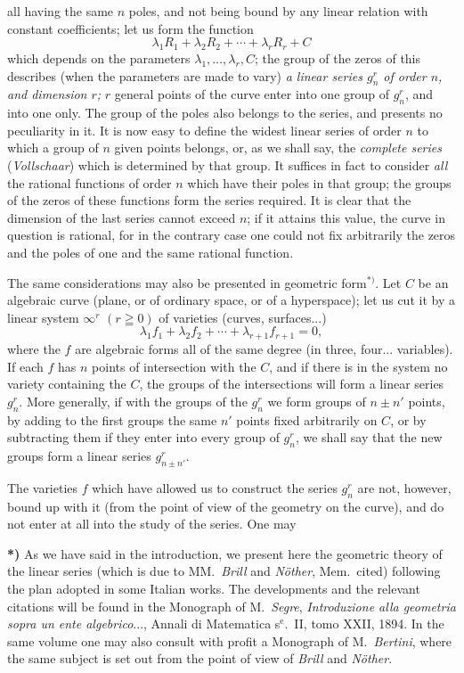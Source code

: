 \documentclass{article}
\begin{document}
all having the same $n$ poles, and not being bound by any linear relation with constant coefficients; let us form the function
\[ \lambda_{1} R_{1} + \lambda_{2} R_{2} + \cdots + \lambda_{r} R_{r} + C \]
which depends on the parameters $\lambda_{1}, \ldots , \lambda_{r}, C$; the group of the zeros of this describes (when the parameters are made to vary) \emph{a linear series $g_{n}^{r}$ of order $n$, and dimension $r$;} $r$ general points of the curve enter into one group of $g_{n}^{r}$, and into one only. The group of the poles also belongs to the series, and presents no peculiarity in it. It is now easy to define the widest linear series of order $n$ to which a group of $n$ given points belongs, or, as we shall say, the \emph{complete series} (\emph{Vollschaar}) which is determined by that group. It suffices in fact to consider \emph{all} the rational functions of order $n$ which have their poles in that group; the groups of the zeros of these functions form the series required. It is clear that the dimension of the last series cannot exceed $n$; if it attains this value, the curve in question is rational, for in the contrary case one could not fix arbitrarily the zeros and the poles of one and the same rational function.

The same considerations may also be presented in geometric form${}^{*)}$. Let $C$ be an algebraic curve (plane, or of ordinary space, or of a hyperspace); let us cut it by a linear system $\infty^{r}$ $(r \geqq 0)$ of varieties (curves, surfaces...)
\[ \lambda_{1} f_{1} + \lambda_{2} f_{2} + \cdots + \lambda_{r+1} f_{r+1} = 0, \]
where the $f$ are algebraic forms all of the same degree (in three, four... variables). If each $f$ has $n$ points of intersection with the $C$, and if there is in the system no variety containing the $C$, the groups of the intersections will form a linear series $g_{n}^{r}$. More generally, if with the groups of the $g_{n}^{r}$ we form groups of $n \pm n'$ points, by adding to the first groups the same $n'$ points fixed arbitrarily on $C$, or by subtracting them if they enter into every group of $g_{n}^{r}$, we shall say that the new groups form a linear series $g_{n \pm n'}^{r}$.

The varieties $f$ which have allowed us to construct the series $g_{n}^{r}$ are not, however, bound up with it (from the point of view of the geometry on the curve), and do not enter at all into the study of the series. One may

\textbf{*)} As we have said in the introduction, we present here the geometric theory of the linear series (which is due to MM.\ \emph{Brill} and \emph{Nöther}, Mem.\ cited) following the plan adopted in some Italian works. The developments and the relevant citations will be found in the Monograph of M.\ \emph{Segre}, \emph{Introduzione alla geometria sopra un ente algebrico}..., Annali di Matematica s${}^{\text{e}}$.\ II, tomo XXII, 1894. In the same volume one may also consult with profit a Monograph of M.\ \emph{Bertini}, where the same subject is set out from the point of view of \emph{Brill} and \emph{Nöther}.
\end{document}
